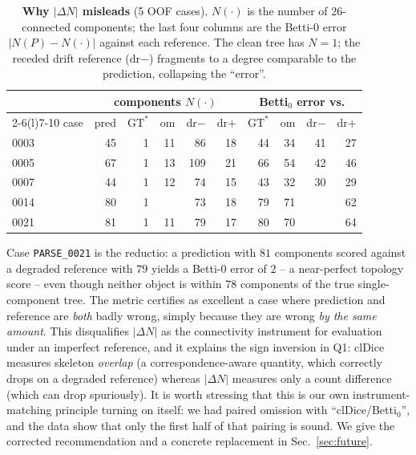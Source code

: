 \documentclass[
    bookmarks, bookmarksnumbered, bookmarksopen,
    colorlinks=true, citecolor=blue, linkcolor=blue, urlcolor=blue
]{techrep}
\newcommand{\gtstar}{\ensuremath{\mathrm{GT}^{\!*}}}
\begin{document}
\begin{table}[t]
  \centering
  \caption{\textbf{Why $|\Delta N|$ misleads} (5 OOF cases). $N(\cdot)$ is the number of
  $26$-connected components; the last four columns are the Betti-$0$ error $|N(P)-N(\cdot)|$
  against each reference. The clean tree has $N{=}1$; the receded drift reference (dr$-$)
  fragments to a degree comparable to the prediction, collapsing the ``error''.}
  \label{tab:betti}
  \small
  \begin{tabular}{lrrrrr@{\hskip 1.2em}rrrr}
    \toprule
    & \multicolumn{5}{c}{components $N(\cdot)$} & \multicolumn{4}{c}{Betti$_0$ error vs.} \\
    \cmidrule(lr){2-6}\cmidrule(l){7-10}
    case & pred & $\gtstar$ & om & dr$-$ & dr$+$ & $\gtstar$ & om & dr$-$ & dr$+$ \\
    \midrule
    0003 & 45 & 1 & 11 & 86 & 18 & 44 & 34 & 41 & 27 \\
    0005 & 67 & 1 & 13 & 109 & 21 & 66 & 54 & 42 & 46 \\
    0007 & 44 & 1 & 12 & 74 & 15 & 43 & 32 & 30 & 29 \\
    0014 & 80 & 1 & \;9 & 73 & 18 & 79 & 71 & \;7 & 62 \\
    0021 & 81 & 1 & 11 & 79 & 17 & 80 & 70 & \;2 & 64 \\
    \bottomrule
  \end{tabular}
\end{table}

Case \texttt{PARSE\_0021} is the reductio: a prediction with $81$ components scored against a
degraded reference with $79$ yields a Betti-$0$ error of $2$ -- a near-perfect topology score --
even though neither object is within $78$ components of the true single-component tree. The
metric certifies as excellent a case where prediction and reference are \emph{both} badly wrong,
simply because they are wrong \emph{by the same amount}. This disqualifies $|\Delta N|$ as the
connectivity instrument for evaluation under an imperfect reference, and it explains the sign
inversion in Q1: clDice measures skeleton \emph{overlap} (a correspondence-aware quantity, which
correctly drops on a degraded reference) whereas $|\Delta N|$ measures only a count difference
(which can drop spuriously). It is worth stressing that this is our own instrument-matching
principle turning on itself: we had paired omission with ``clDice/Betti$_0$'', and the data show
that only the first half of that pairing is sound. We give the corrected recommendation and a
concrete replacement in Sec.~\ref{sec:future}.
\end{document}
